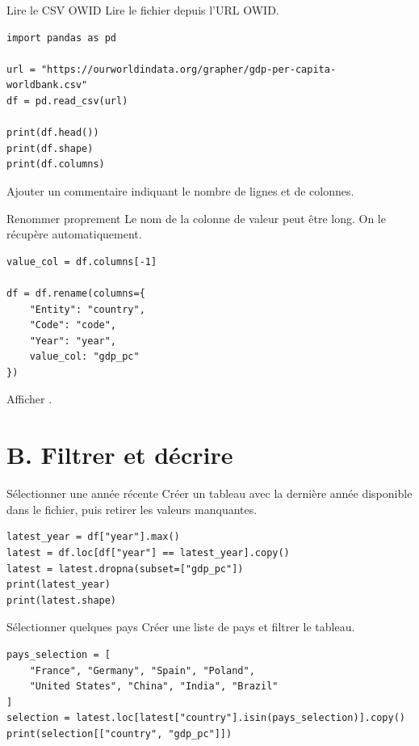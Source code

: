\documentclass[11pt,a4paper]{article}
\begin{document}
\begin{mandatoryexercise}{Lire le CSV OWID}
Lire le fichier depuis l'URL OWID.
\begin{lstlisting}
import pandas as pd

url = "https://ourworldindata.org/grapher/gdp-per-capita-worldbank.csv"
df = pd.read_csv(url)

print(df.head())
print(df.shape)
print(df.columns)
\end{lstlisting}
Ajouter un commentaire indiquant le nombre de lignes et de colonnes.
\end{mandatoryexercise}

\begin{mandatoryexercise}{Renommer proprement}
Le nom de la colonne de valeur peut être long. On le récupère automatiquement.
\begin{lstlisting}
value_col = df.columns[-1]

df = df.rename(columns={
    "Entity": "country",
    "Code": "code",
    "Year": "year",
    value_col: "gdp_pc"
})
\end{lstlisting}
Afficher .
\end{mandatoryexercise}

\section*{B. Filtrer et décrire}

\begin{mandatoryexercise}{Sélectionner une année récente}
Créer un tableau  avec la dernière année disponible dans le fichier, puis retirer les valeurs manquantes.
\begin{lstlisting}
latest_year = df["year"].max()
latest = df.loc[df["year"] == latest_year].copy()
latest = latest.dropna(subset=["gdp_pc"])
print(latest_year)
print(latest.shape)
\end{lstlisting}
\end{mandatoryexercise}

\begin{mandatoryexercise}{Sélectionner quelques pays}
Créer une liste de pays et filtrer le tableau.
\begin{lstlisting}
pays_selection = [
    "France", "Germany", "Spain", "Poland",
    "United States", "China", "India", "Brazil"
]
selection = latest.loc[latest["country"].isin(pays_selection)].copy()
print(selection[["country", "gdp_pc"]])
\end{lstlisting}
\end{mandatoryexercise}
\end{document}
